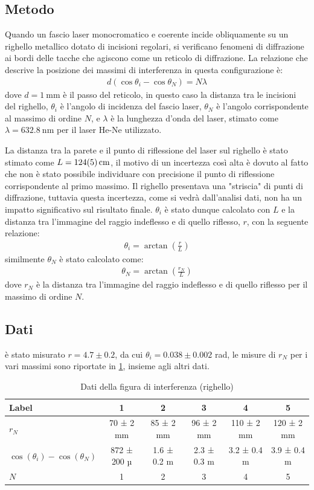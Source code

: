 \documentclass[a4paper]{article}
\begin{document}
\subsection{Metodo}
Quando un fascio laser monocromatico e coerente incide obliquamente su un righello metallico dotato di incisioni regolari, si verificano fenomeni di diffrazione ai bordi delle tacche che agiscono come un reticolo di diffrazione. La relazione che descrive la posizione dei massimi di interferenza in questa configurazione è: 
\begin{align}
    d(\cos\theta_i - \cos\theta_N) = N\lambda
\end{align}
dove $d=\SI{1}{\milli\meter}$ è il passo del reticolo, in questo caso la distanza tra le incisioni del righello, $\theta_i$ è l'angolo di incidenza del fascio laser, $\theta_N$ è l'angolo corrispondente al massimo di ordine $N$, e $\lambda$ è la lunghezza d'onda del laser, stimato come $\lambda=\SI{632.8}{\nano\meter}$ per il laser He-Ne utilizzato.

La distanza tra la parete e il punto di riflessione del laser sul righello è stato stimato come $L=\SI{124 \pm 5}{\centi\meter}$, il motivo di un incertezza così alta è dovuto al fatto che non è stato possibile individuare con precisione il punto di riflessione corrispondente al primo massimo. Il righello presentava una "striscia" di punti di diffrazione, tuttavia questa incertezza, come si vedrà dall'analisi dati, non ha un impatto significativo sul risultato finale. $\theta_i$ è stato dunque calcolato con $L$ e la distanza tra l'immagine del raggio indeflesso e di quello riflesso, $r$, con la seguente relazione:
\begin{align}   
    \theta_i = \arctan\left(\frac{r}{L}\right)
\end{align}
similmente $\theta_N$ è stato calcolato come:
\begin{align}
    \theta_N = \arctan\left(\frac{r_N}{L}\right)
\end{align}
dove $r_N$ è la distanza tra l'immagine del raggio indeflesso e di quello riflesso per il massimo di ordine $N$.
\subsection{Dati}
è stato misurato $r=4.7\pm0.2$, da cui $\theta_i=0.038\pm0.002$ rad, le misure di $r_N$ per i vari massimi sono riportate in \cref{tab:interferenza-righello}, insieme agli altri dati.

\begin{table}[htbp]
\centering
\begin{tabular}{|l|ccccc|}
\hline
Label & 1 & 2 & 3 & 4 & 5 \\\hline\hline
$r_N$ & 70 ± 2 mm & 85 ± 2 mm & 96 ± 2 mm & 110 ± 2 mm & 120 ± 2 mm \\\hline
$\cos(\theta_i) - \cos(\theta_N)$ & 872 ± 200 µ & 1.6 ± 0.2 m & 2.3 ± 0.3 m & 3.2 ± 0.4 m & 3.9 ± 0.4 m \\\hline
$N$ & 1 & 2 & 3 & 4 & 5 \\\hline
\end{tabular}
\caption{Dati della figura di interferenza (righello)}
\label{tab:interferenza-righello}
\end{table}
\end{document}
